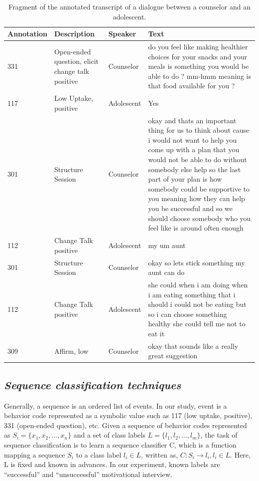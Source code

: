 \documentclass{amia}
\begin{document}
\begin{table}[htb]
\caption{Fragment of the annotated transcript of a dialogue between a counselor and an adolescent.}    
\label{table:anno_examp}
\centering
\begin{tabular}{lp{3.6cm}lp{8cm}}
\hline
\hline
Annotation  & Description & Speaker & Text \\
\hline
331 &	Open-ended question, elicit change talk positive &	Counselor &	do you feel like making healthier choices for your snacks and your meals is something you would be able to do ? mm-hmm meaning is that food available for you ? \\
117 &	Low Uptake, positive	& Adolescent &	Yes \\
301 &	Structure Session	& Counselor &	okay and thats an important thing for us to think about cause i would not want to help you come up with a plan that you would not be able to do without somebody else help so the last part of your plan is how somebody could be supportive to you meaning how they can help you be successful and so we should choose somebody who you feel like is around often enough \\
112 &	Change Talk positive	& Adolescent &	my um aunt \\
301 &	Structure Session	& Counselor &	okay so lets stick something my aunt can do \\
112 &	Change Talk positive &	Adolescent &	she could when i am doing when i am eating something that i should i could not be eating but so i can choose something healthy she could tell me not to eat it \\
309 &	Affirm, low &	Counselor &	okay that sounds like a really great suggestion \\
\hline
\hline
\end{tabular}
\end{table}

\subsection*{\textit{Sequence classification techniques}}
Generally, a sequence is an ordered list of events. In our study, event is a behavior code represented as a symbolic value such as 117 (low uptake, positive), 331 (open-ended question), etc.  Given a sequence of behavior codes represented as $S_i = \{x_1, x_2,...,x_n\}$ and a set of class labels $L = \{l_1, l_2,...,l_m\}$, the task of sequence classification is to learn a sequence classifier C, which is a function mapping a sequence $S_i$ to a class label $l_i \in L$, written as, $C : S_i \to l_i, l_i \in L$. Here, L is fixed and known in advances. In our experiment, known labels are ``successful'' and ``unsuccessful'' motivational interview. 
\end{document}

